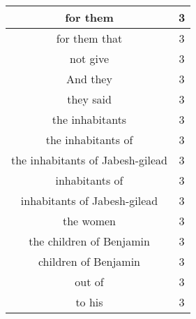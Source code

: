 \begin{center}
\begin{longtable}{|c|c|}
for them & 3\\ \hline 
for them that & 3\\ \hline 
not give & 3\\ \hline 
And they & 3\\ \hline 
they said & 3\\ \hline 
the inhabitants & 3\\ \hline 
the inhabitants of & 3\\ \hline 
the inhabitants of Jabesh-gilead & 3\\ \hline 
inhabitants of & 3\\ \hline 
inhabitants of Jabesh-gilead & 3\\ \hline 
the women & 3\\ \hline 
the children of Benjamin & 3\\ \hline 
children of Benjamin & 3\\ \hline 
out of & 3\\ \hline 
to his & 3\\ \hline 
\end{longtable}
\end{center}





